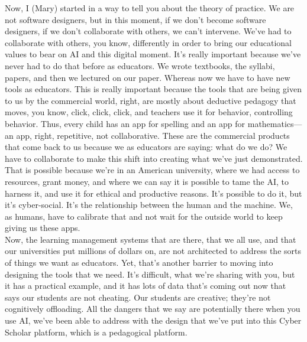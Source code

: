 \documentclass[english]{textolivre}
\begin{document}
{    Now, I (Mary) started in a way to tell you about the theory of practice. We are not software designers, but in this moment, if we don’t become software designers, if we don’t collaborate with others, we can’t intervene. We’ve had to collaborate with others, you know, differently in order to bring our educational values to bear on AI and this digital moment. It’s really important because we’ve never had to do that before as educators. We wrote textbooks, the syllabi, papers, and then we lectured on our paper. Whereas now we have to have new tools as educators. This is really important because the tools that are being given to us by the commercial world, right, are mostly about deductive pedagogy that moves, you know, click, click, click, and teachers use it for behavior, controlling behavior. Thus, every child has an app for spelling and an app for mathematics—an app, right, repetitive, not collaborative. These are the commercial products that come back to us because we as educators are saying: what do we do? We have to collaborate to make this shift into creating what we’ve just demonstrated. That is possible because we’re in an American university, where we had access to resources, grant money, and where we can say it is possible to tame the AI, to harness it, and use it for ethical and productive reasons. It’s possible to do it, but it’s cyber-social. It’s the relationship between the human and the machine. We, as humans, have to calibrate that and not wait for the outside world to keep giving us these apps.\\
    Now, the learning management systems that are there, that we all use, and that our universities put millions of dollars on, are not architected to address the sorts of things we want as educators. Yet, that’s another barrier to moving into designing the tools that we need. It’s difficult, what we’re sharing with you, but it has a practical example, and it has lots of data that’s coming out now that says our students are not cheating. Our students are creative; they’re not cognitively offloading. All the dangers that we say are potentially there when you use AI, we’ve been able to address with the design that we’ve put into this Cyber Scholar platform, which is a pedagogical platform.
}
    \begin{description}
        \interviewcontent
    \end{description}
\end{document}
